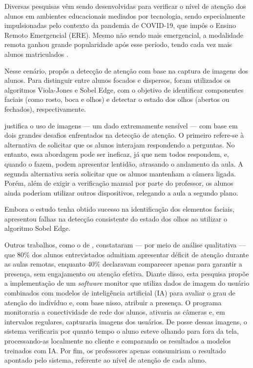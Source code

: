 Diversas pesquisas vêm sendo desenvolvidas para verificar o nível de atenção dos alunos em ambientes educacionais mediados por tecnologia, sendo especialmente impulsionadas pelo contexto da pandemia de COVID-19, que impôs o Ensino Remoto Emergencial (ERE). Mesmo não sendo mais emergencial, a modalidade remota ganhou grande popularidade após esse período, tendo cada vez mais alunos matriculados \cite{moranEnsinoSuperiorDistancia2009}.

Nesse cenário,  propôs a detecção de atenção com base na captura de imagens dos alunos. Para distinguir entre alunos focados e dispersos, foram utilizados os algoritmos Viola-Jones e Sobel Edge, com o objetivo de identificar componentes faciais (como rosto, boca e olhos) e detectar o estado dos olhos (abertos ou fechados), respectivamente.

 justifica o uso de imagens — um dado extremamente sensível — com base em dois grandes desafios enfrentados na detecção de atenção. O primeiro refere-se à alternativa de solicitar que os alunos interajam respondendo a perguntas. No entanto, essa abordagem pode ser ineficaz, já que nem todos respondem, e, quando o fazem, podem apresentar lentidão, atrasando o andamento da aula. A segunda alternativa seria solicitar que os alunos mantenham a câmera ligada. Porém, além de exigir a verificação manual por parte do professor, os alunos ainda poderiam utilizar outros dispositivos, relegando a aula a segundo plano.

Embora o estudo tenha obtido sucesso na identificação dos elementos faciais, apresentou falhas na detecção consistente do estado dos olhos ao utilizar o algoritmo Sobel Edge.

Outros trabalhos, como o de , constataram — por meio de análise qualitativa — que 80\% dos alunos entrevistados admitiam apresentar déficit de atenção durante as aulas remotas, enquanto 40\% declaravam comparecer apenas para garantir a presença, sem engajamento ou atenção efetiva. Diante disso, esta pesquisa propõe a implementação de um \textit{software} monitor que utiliza dados de imagem do usuário combinados com modelos de inteligência artificial (IA) para avaliar o grau de atenção do indivíduo e, com base nisso, atribuir a presença. O programa monitoraria a conectividade de rede dos alunos, ativaria as câmeras e, em intervalos regulares, capturaria imagens dos usuários. De posse dessas imagens, o sistema verificaria por quanto tempo o aluno esteve olhando para fora da tela, processando-as localmente no cliente e comparando os resultados a modelos treinados com IA. Por fim, os professores apenas consumiriam o resultado apontado pelo sistema, referente ao nível de atenção de cada aluno.

